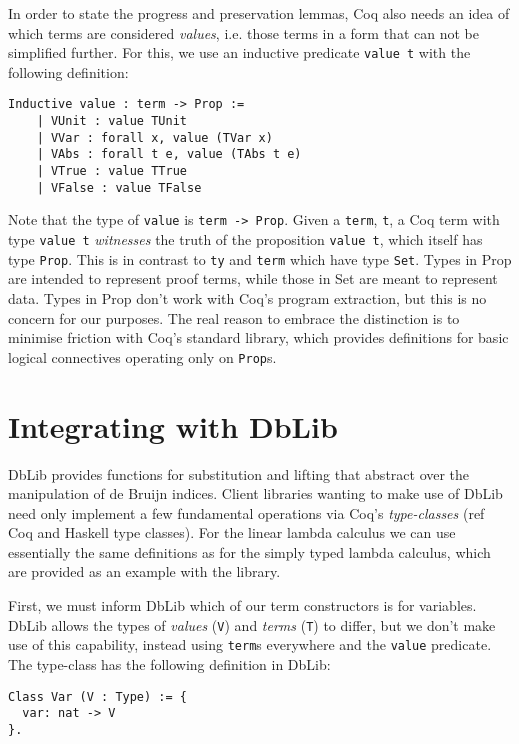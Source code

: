 \documentclass[]{unswthesis}
\let\c\texttt
\let\i\textit
\begin{document}
In order to state the progress and preservation lemmas, Coq also needs an idea of which terms are considered \i{values}, i.e. those terms in a form that can not be simplified further. For this, we use an inductive predicate \c{value t} with the following definition:

\begin{verbatim}
Inductive value : term -> Prop :=
    | VUnit : value TUnit
    | VVar : forall x, value (TVar x)
    | VAbs : forall t e, value (TAbs t e)
    | VTrue : value TTrue
    | VFalse : value TFalse
\end{verbatim}

Note that the type of \c{value} is \c{term -> Prop}. Given a \c{term}, \c{t}, a Coq term with type \c{value t} \i{witnesses} the truth of the proposition \c{value t}, which itself has type \c{Prop}. This is in contrast to \c{ty} and \c{term} which have type \c{Set}. Types in Prop are intended to represent proof terms, while those in Set are meant to represent data. Types in Prop don't work with Coq's program extraction, but this is no concern for our purposes. The real reason to embrace the distinction is to minimise friction with Coq's standard library, which provides definitions for basic logical connectives operating only on \c{Prop}s.

\section{Integrating with DbLib}

DbLib provides functions for substitution and lifting that abstract over the manipulation of de Bruijn indices. Client libraries wanting to make use of DbLib need only implement a few fundamental operations via Coq's \i{type-classes} (ref Coq and Haskell type classes). For the linear lambda calculus we can use essentially the same definitions as for the simply typed lambda calculus, which are provided as an example with the library.

First, we must inform DbLib which of our term constructors is for variables. DbLib allows the types of \i{values} (\c{V}) and \i{terms} (\c{T}) to differ, but we don't make use of this capability, instead using \c{term}s everywhere and the \c{value} predicate. The type-class has the following definition in DbLib:

\begin{verbatim}
Class Var (V : Type) := {
  var: nat -> V
}.
\end{verbatim}
\end{document}
